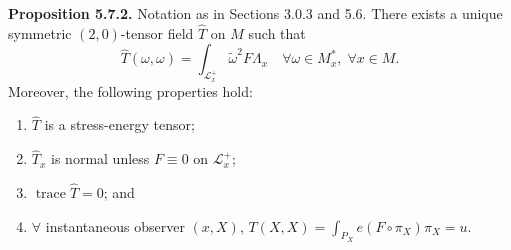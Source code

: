 \textbf{Proposition 5.7.2.} Notation as in Sections 3.0.3 and 5.6. There exists a unique symmetric $(2, 0)$-tensor field $\hat{T}$ on $M$ such that
$$\hat{T}(\omega, \omega) = \int_{\mathcal{L}_x^+} \tilde{\omega}^2 F \Lambda_x \quad \forall \omega \in M_x^*,\; \forall x \in M.$$
Moreover, the following properties hold:
\begin{enumerate}
\item[(a)] $\hat{T}$ is a stress-energy tensor;
\item[(b)] $\hat{T}_x$ is normal unless $F \equiv 0$ on $\mathcal{L}_x^+$;
\item[(c)] $\operatorname{trace} \hat{T} = 0$; and
\item[(d)] $\forall$ instantaneous observer $(x, X)$, $T(X, X) = \int_{P_X} e(F \circ \pi_X) \pi_X = u$.
\end{enumerate}
